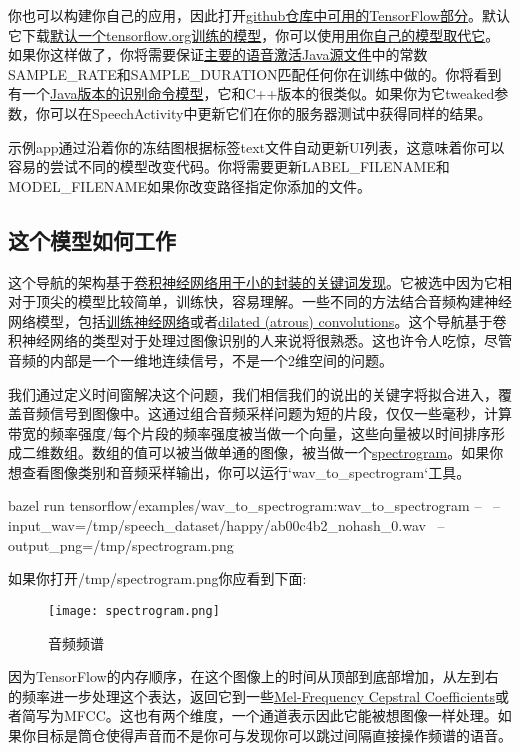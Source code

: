 你也可以构建你自己的应用，因此打开\href{https://github.com/tensorflow/tensorflow/tree/master/tensorflow/examples/android#building-in-android-studio-using-the-tensorflow-aar-from-jcenter}{github仓库中可用的TensorFlow部分}。默认它下载\href{http://download.tensorflow.org/models/speech_commands_v0.01.zip}{默认一个tensorflow.org训练的模型}，你可以使用\href{https://github.com/tensorflow/tensorflow/tree/master/tensorflow/examples/android#install-model-files-optional}{用你自己的模型取代它}。如果你这样做了，你将需要保证\href{https://github.com/tensorflow/tensorflow/tree/master/tensorflow/examples/android/src/org/tensorflow/demo/SpeechActivity.java}{主要的语音激活Java源文件}中的常数SAMPLE\_RATE和SAMPLE\_DURATION匹配任何你在训练中做的。你将看到有一个\href{https://github.com/tensorflow/tensorflow/tree/master/tensorflow/examples/android/src/org/tensorflow/demo/RecognizeCommands.java}{Java版本的识别命令模型}，它和C++版本的很类似。如果你为它tweaked参数，你可以在SpeechActivity中更新它们在你的服务器测试中获得同样的结果。

示例app通过沿着你的冻结图根据标签text文件自动更新UI列表，这意味着你可以容易的尝试不同的模型改变代码。你将需要更新LABEL\_FILENAME和MODEL\_FILENAME如果你改变路径指定你添加的文件。

\subsection{这个模型如何工作}
这个导航的架构基于\href{http://www.isca-speech.org/archive/interspeech_2015/papers/i15_1478.pdf}{卷积神经网络用于小的封装的关键词发现}。它被选中因为它相对于顶尖的模型比较简单，训练快，容易理解。一些不同的方法结合音频构建神经网络模型，包括\href{https://svds.com/tensorflow-rnn-tutorial/}{训练神经网络}或者\href{https://deepmind.com/blog/wavenet-generative-model-raw-audio/}{dilated (atrous) convolutions}。这个导航基于卷积神经网络的类型对于处理过图像识别的人来说将很熟悉。这也许令人吃惊，尽管音频的内部是一个一维地连续信号，不是一个2维空间的问题。

我们通过定义时间窗解决这个问题，我们相信我们的说出的关键字将拟合进入，覆盖音频信号到图像中。这通过组合音频采样问题为短的片段，仅仅一些毫秒，计算带宽的频率强度/每个片段的频率强度被当做一个向量，这些向量被以时间排序形成二维数组。数组的值可以被当做单通的图像，被当做一个\href{https://en.wikipedia.org/wiki/Spectrogram}{spectrogram}。如果你想查看图像类别和音频采样输出，你可以运行`wav\_to\_spectrogram`工具。
\begin{bashcode}
bazel run tensorflow/examples/wav_to_spectrogram:wav_to_spectrogram -- \
--input_wav=/tmp/speech_dataset/happy/ab00c4b2_nohash_0.wav \
--output_png=/tmp/spectrogram.png 
\end{bashcode}
如果你打开/tmp/spectrogram.png你应看到下面:
\begin{figure}[H]
\centering
\texttt{[image: spectrogram.png]}
\caption{音频频谱}
\end{figure}
因为TensorFlow的内存顺序，在这个图像上的时间从顶部到底部增加，从左到右的频率进一步处理这个表达，返回它到一些\href{https://en.wikipedia.org/wiki/Mel-frequency\_cepstrum}{Mel-Frequency Cepstral Coefficients}或者简写为MFCC。这也有两个维度，一个通道表示因此它能被想图像一样处理。如果你目标是筒仓使得声音而不是你可与发现你可以跳过间隔直接操作频谱的语音。

